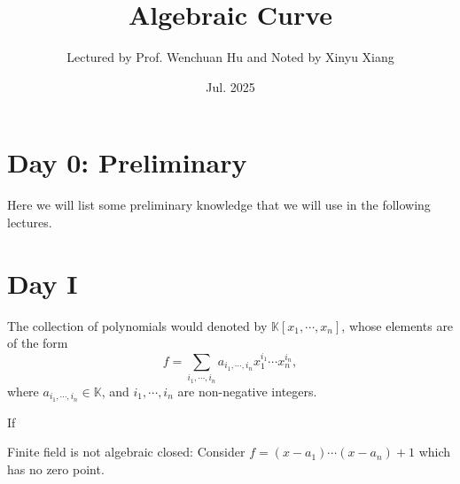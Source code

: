 \documentclass[10pt]{article}
\title{\textbf{Algebraic Curve}}
\author{Lectured by Prof. Wenchuan Hu and Noted by Xinyu Xiang}
\date{Jul. 2025}
\begin{document}
\maketitle

\section{Day 0: Preliminary}

Here we will list some preliminary knowledge that we will use in the following lectures.

\section{Day I}

%

\begin{definition}[Polynomial]
  The collection of polynomials would denoted by $ \mathbb{K}[x_1,\cdots ,x_{n}]$, whose elements are of the form
  \begin{equation*}
    f = \sum_{i_1,\cdots ,i_n} a_{i_1,\cdots ,i_n} x_1^{i_1}\cdots x_n^{i_n},
  \end{equation*}
  where $ a_{i_1,\cdots ,i_n} \in \mathbb{K}$, and $ i_1,\cdots ,i_n$ are non-negative integers.
\end{definition}

\begin{definition}
  If
\end{definition}

\begin{remark}
  Finite field is not algebraic closed: Consider $ f = (x - a_{1}) \cdots (x - a_{n}) + 1$ which has no zero point.
\end{remark}
\end{document}
